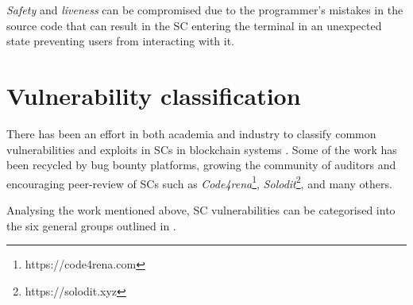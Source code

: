 \documentclass[oneside]{ecsproject}     %
\begin{document}
\textit{Safety} and \textit{liveness} can be compromised due to the programmer's mistakes in the source code that can result in the SC entering the terminal in an unexpected state
preventing users from interacting with it\cite{ondo_report}.


\section{Vulnerability classification}

There has been an effort in both academia and industry to classify common vulnerabilities 
and exploits in SCs in blockchain systems \cite{owasp}\cite{stefano}\cite{atzei_survey}. 
Some of the work has been recycled by bug bounty platforms, growing the community of auditors
and encouraging peer-review of SCs such as \textit{Code4rena}\footnote{https://code4rena.com}, \textit{Solodit}\footnote{https://solodit.xyz},
and many others.

Analysing the work mentioned above, SC vulnerabilities can be categorised into the six general groups outlined in .
\end{document}
